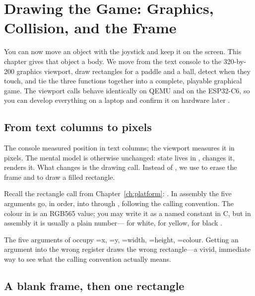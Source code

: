 \chapter{Drawing the Game: Graphics, Collision, and the Frame}
\label{ch:asm3}

You can now move an object with the joystick and keep it on the screen. This
chapter gives that object a body. We move from the text console to the
320-by-200 graphics viewport, draw rectangles for a paddle and a ball, detect
when they touch, and tie the three functions together into a complete, playable
graphical game. The viewport calls behave identically on QEMU and on the
ESP32\nobreakdash-C6, so you can develop everything on a laptop and confirm it on hardware
later \citep{prg32qemu,prg32tutorialgraphic}.

\section{From text columns to pixels}

The console measured position in text columns; the viewport measures it in
pixels. The mental model is otherwise unchanged: state lives in ,
 changes it,  renders it. What changes is the drawing
call. Instead of , we use  to
erase the frame and  to draw a filled rectangle.

Recall the rectangle call from Chapter~\ref{ch:platform}:
. In assembly the five arguments go,
in order, into  through , following the calling convention. The
colour in  is an RGB565 value; you may write it as a named constant in C,
but in assembly it is usually a plain number--- for white,
 for yellow,  for black \citep{prg32repo}.

\begin{prgconcept}
The five arguments of  occupy =x, =y,
=width, =height, =colour. Getting an argument into the
wrong register draws the wrong rectangle---a vivid, immediate way to see what the
calling convention actually means.
\end{prgconcept}

\section{A blank frame, then one rectangle}

